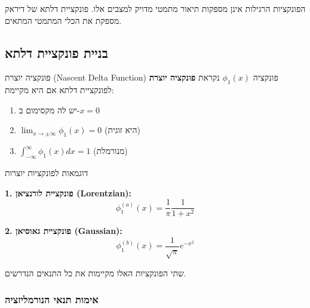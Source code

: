 \documentclass{article}
\begin{document}
הפונקציות הרגילות אינן מספקות תיאור מתמטי מדויק למצבים אלו. פונקציית דלתא של דיראק מספקת את הכלי המתמטי המתאים.

\subsection{בניית פונקציית דלתא}

\begin{definitionbox}{פונקציה יוצרת (Nascent Delta Function)}
פונקציה $\phi_1(x)$ נקראת \textbf{פונקציה יוצרת} לפונקציית דלתא אם היא מקיימת:
\begin{enumerate}
\item יש לה מקסימום ב-$x=0$
\item $\lim_{x\to\pm\infty}\phi_1(x) = 0$ (היא זוגית)
\item $\displaystyle\int_{-\infty}^{\infty}\phi_1(x)dx = 1$ (מנורמלת)
\end{enumerate}
\end{definitionbox}

\begin{examplebox}{דוגמאות לפונקציות יוצרות}

\textbf{1. פונקציית לורנציאן (Lorentzian):}
\[
\phi_1^{(a)}(x) = \frac{1}{\pi}\frac{1}{1+x^2}
\]

\textbf{2. פונקציית גאוסיאן (Gaussian):}
\[
\phi_1^{(b)}(x) = \frac{1}{\sqrt{\pi}}e^{-x^2}
\]

שתי הפונקציות האלו מקיימות את כל התנאים הנדרשים.
\end{examplebox}

\subsubsection*{אימות תנאי הנורמליזציה}
\end{document}
